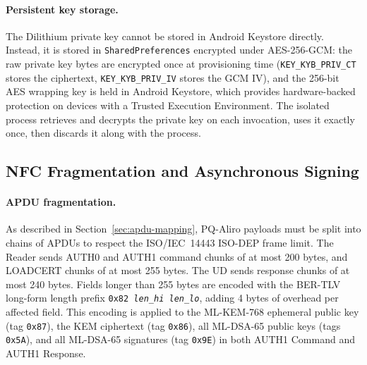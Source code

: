 \paragraph{Persistent key storage.}
The Dilithium private key cannot be stored in Android Keystore directly.
Instead, it is stored in \texttt{SharedPreferences} encrypted under AES-256-GCM:
the raw private key bytes are encrypted once at provisioning time
(\texttt{KEY\_KYB\_PRIV\_CT} stores the ciphertext, \texttt{KEY\_KYB\_PRIV\_IV}
stores the GCM IV), and the 256-bit AES wrapping key is held in Android
Keystore, which provides hardware-backed protection on devices with a Trusted
Execution Environment.
The isolated process retrieves and decrypts the private key on each invocation,
uses it exactly once, then discards it along with the process.

\subsection{NFC Fragmentation and Asynchronous Signing}
\label{sec:impl:frag}

\paragraph{APDU fragmentation.}
As described in Section~\ref{sec:apdu-mapping}, PQ-Aliro payloads must be
split into chains of APDUs to respect the ISO/IEC~14443 ISO-DEP frame limit.
The Reader sends AUTH0 and AUTH1 command chunks of at most 200 bytes, and
LOADCERT chunks of at most 255 bytes.
The UD sends response chunks of at most 240 bytes.
Fields longer than 255 bytes are encoded with the BER-TLV long-form length
prefix \texttt{0x82\,\textit{len\_hi}\,\textit{len\_lo}}, adding 4 bytes of
overhead per affected field.
This encoding is applied to the ML-KEM-768 ephemeral public key (tag
\texttt{0x87}), the KEM ciphertext (tag \texttt{0x86}), all ML-DSA-65
public keys (tags \texttt{0x5A}), and all ML-DSA-65 signatures (tag
\texttt{0x9E}) in both AUTH1 Command and AUTH1 Response.

